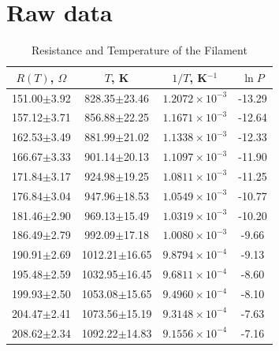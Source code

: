 \documentclass[12pt]{article}
\begin{document}
    
    

    \appendix
    \cleardoublepage

    \section{Raw data}
    \label{app:data}
    
    \begin{table}[h]
    \caption{Resistance and Temperature of the Filament}
    \label{tab:data}
    \vspace{0.15in}
    \begin{center}
    \begin{tabular}{|c|c|c|c|}
    \hline
    $R(T)$, $\Omega$ & $T$, K & $1/T$, K$^{-1}$ & $\ln P$ \\
    \hline
    151.00$\pm$3.92 & 828.35$\pm$23.46& $1.2072\times10^{-3}$& -13.29 \\
    157.12$\pm$3.71 & 856.88$\pm$22.25& $1.1671\times10^{-3}$& -12.64 \\
    162.53$\pm$3.49 & 881.99$\pm$21.02& $1.1338\times10^{-3}$& -12.33 \\
    166.67$\pm$3.33 & 901.14$\pm$20.13& $1.1097\times10^{-3}$& -11.90 \\
    171.84$\pm$3.17 & 924.98$\pm$19.25& $1.0811\times10^{-3}$& -11.25 \\ 
    176.84$\pm$3.04 & 947.96$\pm$18.53& $1.0549\times10^{-3}$& -10.77 \\
    181.46$\pm$2.90 & 969.13$\pm$15.49& $1.0319\times10^{-3}$& -10.20 \\
    186.49$\pm$2.79 & 992.09$\pm$17.18& $1.0080\times10^{-3}$& -9.66 \\
    190.91$\pm$2.69 & 1012.21$\pm$16.65& $9.8794\times10^{-4}$& -9.13 \\
    195.48$\pm$2.59 & 1032.95$\pm$16.45& $9.6811\times10^{-4}$& -8.60 \\
    199.93$\pm$2.50 & 1053.08$\pm$15.65& $9.4960\times10^{-4}$& -8.10 \\
    204.47$\pm$2.41 & 1073.56$\pm$15.19& $9.3148\times10^{-4}$& -7.63 \\
    208.62$\pm$2.34 & 1092.22$\pm$14.83& $9.1556\times10^{-4}$& -7.16 \\
    \hline
    \end{tabular}
    \end{center}  
    \end{table}
\end{document}
